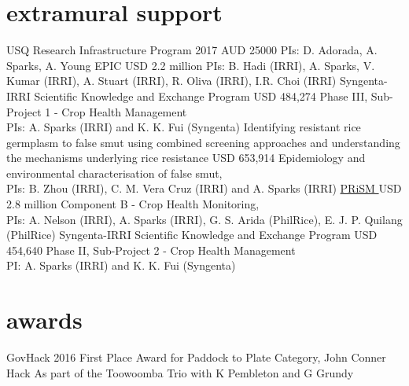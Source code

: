 \section*{extramural support}
  \begin{entrylist}
    
      {USQ Research Infrastructure Program 2017}
      {AUD 25000}
      {PIs: D. Adorada, A. Sparks, A. Young}
      {EPIC }
      {USD 2.2 million}
      {PIs: B. Hadi (IRRI), A. Sparks, V. Kumar (IRRI), A. Stuart (IRRI), R. Oliva (IRRI), I.R. Choi (IRRI)}
	    {Syngenta-IRRI Scientific Knowledge and Exchange Program}
	    {USD 484,274}
	    {Phase III, Sub-Project 1 - Crop Health Management\\PIs: A. Sparks (IRRI) and K. K. Fui (Syngenta)}
      {Identifying resistant rice germplasm to false smut using combined screening approaches and understanding the mechanisms underlying rice resistance}
      {USD 653,914}
      {Epidemiology and environmental characterisation of false smut,\\PIs: B. Zhou (IRRI), C. M. {Vera Cruz} (IRRI) and A. Sparks (IRRI)}
	    {\href{http://philippinericeinfo.ph/}{PRiSM }}
	    {USD 2.8 million}
	    {Component B - Crop Health Monitoring,\\PIs: A. Nelson (IRRI), A. Sparks (IRRI), G. S. Arida (PhilRice), E. J. P. Quilang (PhilRice)}
	    {Syngenta-IRRI Scientific Knowledge and Exchange Program}
	    {USD 454,640}
	    {Phase II, Sub-Project 2 - Crop Health Management\\PI: A. Sparks (IRRI) and K. K. Fui (Syngenta)}
\end{entrylist}

\section*{awards}
  \begin{entrylist}
    {GovHack 2016 First Place Award for Paddock to Plate Category, John Conner Hack}
    {}
    {As part of the Toowoomba Trio with K Pembleton and G Grundy}
  \end{entrylist}
